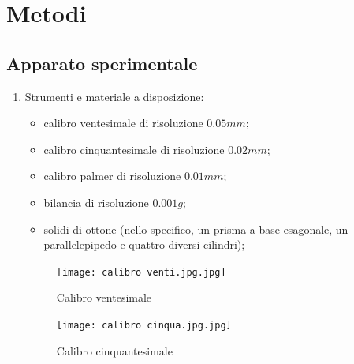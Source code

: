 \documentclass{article}
\begin{document}
\FloatBarrier
 
\section{Metodi} 

\subsection{Apparato sperimentale} %
\label{subsec: metodi}
\begin{enumerate}
    \item Strumenti e materiale a disposizione:
    \begin{itemize}
        \item calibro ventesimale di risoluzione $0.05 mm$;
        \item calibro cinquantesimale di risoluzione $0.02 mm$;
        \item calibro palmer di risoluzione $0.01mm$;
        \item bilancia di risoluzione $0.001g$;
        \item solidi di ottone (nello specifico, un prisma a base esagonale, un parallelepipedo e quattro diversi cilindri);

    \end{itemize}

\begin{figure} [h]
    \centering
    \texttt{[image: calibro venti.jpg.jpg]}
    \caption{Calibro ventesimale}
    \label{fig:my_label}
\end{figure}

\begin{figure}
    \centering
    \texttt{[image: calibro cinqua.jpg.jpg]}
    \caption{Calibro cinquantesimale}
    \label{fig:my_label}
\end{figure}


\end{enumerate}
\end{document}
